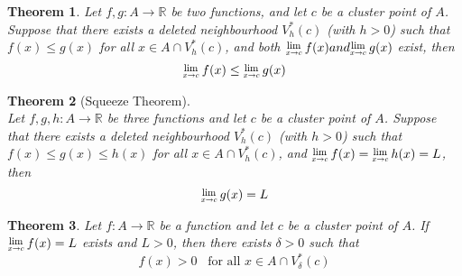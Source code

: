 \documentclass[12pt]{article}
\newcommand{\Lim}[1]{\raisebox{0.5ex}{\scalebox{0.8}{$\displaystyle \lim_{#1}\;$}}}
\newtheorem{theorem}{Theorem}[section]
\theoremstyle{definition}
\begin{document}
\begin{theorem}
\normalfont Let $f,g: A\to \mathbb{R}$ be two functions, and let $c$ be a cluster point of $A$. Suppose that there exists a deleted neighbourhood $V_h^\ast(c)$ (with $h>0$) such that $f(x)\leq g(x)$ for all $x\in A\cap V_h^\ast (c)$, and both $\Lim{x\to c}f(x)and \Lim{x\to c}g(x)$ exist, then
\[
\Lim{x\to c}f(x)\leq \Lim{x\to c}g(x)
\]
\end{theorem}
\begin{theorem}[Squeeze Theorem]
\hfill\\\normalfont Let $f,g,h: A\to\mathbb{R}$ be three functions and let $c$ be a cluster point of $A$. Suppose that there exists a deleted neighbourhood $V_h^\ast(c)$ (with $h>0$) such that $f(x)\leq g(x)\leq h(x)$ for all  $x\in A\cap V_h^\ast (c)$, and $\Lim{x\to c}f(x)=\Lim{x\to c}h(x)=L$, then
\[
\Lim{x\to c}g(x)=L
\]
\end{theorem}
\begin{theorem}\normalfont Let $f:A\to \mathbb{R}$ be a function and let $c$ be a cluster point of $A$. If $\Lim{x\to c}f(x)=L$ exists and $L>0$, then there exists $\delta>0$ such that
\[
f(x)>0\;\;\;\text{for all }x\in A\cap V_\delta^\ast(c)
\]
\end{theorem}
\end{document}
